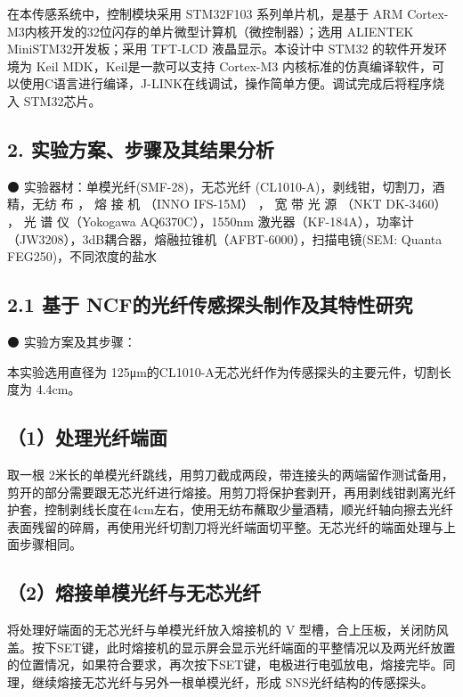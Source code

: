 \documentclass[
  10
]{article}
\begin{document}
在本传感系统中，控制模块采用 STM32F103 系列单片机，是基于 ARM
Cortex-M3内核开发的32位闪存的单片微型计算机（微控制器）；选用 ALIENTEK
MiniSTM32开发板；采用 TFT-LCD 液晶显示。本设计中 STM32 的软件开发环境为
Keil MDK，Keil是一款可以支持 Cortex-M3
内核标准的仿真编译软件，可以使用C语言进行编译，J-LINK在线调试，操作简单方便。调试完成后将程序烧入
STM32芯片。

\subsection{2.
实验方案、步骤及其结果分析}\label{ux5b9eux9a8cux65b9ux6848ux6b65ux9aa4ux53caux5176ux7ed3ux679cux5206ux6790}

⚫ 实验器材：单模光纤(SMF-28)，无芯光纤
(CL1010-A)，剥线钳，切割刀，酒精，无纺 布 ， 熔 接 机 （INNO IFS-15M）
， 宽 带 光 源 （NKT DK-3460） ， 光 谱 仪（Yokogawa AQ6370C），1550nm
激光器（KF-184A），功率计（JW3208），3dB耦合器，熔融拉锥机（AFBT-6000），扫描电镜(SEM:
Quanta FEG250)，不同浓度的盐水

\subsection{2.1 基于
NCF的光纤传感探头制作及其特性研究}\label{ux57faux4e8e-ncfux7684ux5149ux7ea4ux4f20ux611fux63a2ux5934ux5236ux4f5cux53caux5176ux7279ux6027ux7814ux7a76}

⚫ 实验方案及其步骤：

本实验选用直径为
125μm的CL1010-A无芯光纤作为传感探头的主要元件，切割长度为 4.4cm。

\subsection{（1）处理光纤端面}\label{ux5904ux7406ux5149ux7ea4ux7aefux9762}

取一根
2米长的单模光纤跳线，用剪刀截成两段，带连接头的两端留作测试备用，剪开的部分需要跟无芯光纤进行熔接。用剪刀将保护套剥开，再用剥线钳剥离光纤护套，控制剥线长度在4cm左右，使用无纺布蘸取少量酒精，顺光纤轴向擦去光纤表面残留的碎屑，再使用光纤切割刀将光纤端面切平整。无芯光纤的端面处理与上面步骤相同。

\subsection{（2）熔接单模光纤与无芯光纤}\label{ux7194ux63a5ux5355ux6a21ux5149ux7ea4ux4e0eux65e0ux82afux5149ux7ea4}

将处理好端面的无芯光纤与单模光纤放入熔接机的 V
型槽，合上压板，关闭防风盖。按下SET键，此时熔接机的显示屏会显示光纤端面的平整情况以及两光纤放置的位置情况，如果符合要求，再次按下SET键，电极进行电弧放电，熔接完毕。同理，继续熔接无芯光纤与另外一根单模光纤，形成
SNS光纤结构的传感探头。
\end{document}
